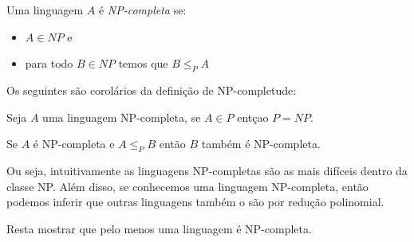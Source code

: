 Uma linguagem $A$ é {\em NP-completa} se:
\begin{itemize}
\item $A \in NP$ e
\item para todo $B \in NP$ temos que $B \leq_P A$
\end{itemize}

Os seguintes são corolários da definição de NP-completude:

\begin{corollary}
  Seja $A$ uma linguagem NP-completa, se $A \in P$ entçao $P = NP$.
\end{corollary}

\begin{corollary}
  Se $A$ é NP-completa e $A \leq_P B$ então $B$ também é NP-completa.
\end{corollary}

Ou seja, intuitivamente as linguagens NP-completas são as mais difíceis dentro da classe NP.
Além disso, se conhecemos uma linguagem NP-completa, então podemos inferir que outras linguagens também o são por redução polinomial.

Resta mostrar que pelo menos uma linguagem é NP-completa.

